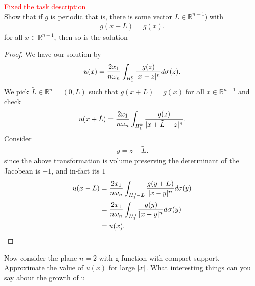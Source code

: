 \begin{exercise}[b]
  \textcolor{Red}{Fixed the task description}\\
 Show that if $g$ is periodic that is, there is some vector $L \in  \mathbb{R}^{n-1} $)  with 
 \begin{align*}
  g(x+L) = g(x)
 .\end{align*}
 for all $x \in  \mathbb{R}^{n-1} $, then so is the solution
\end{exercise}
\begin{proof}
 We have our solution by 
 \begin{align*}
   u(x) = \frac{2x_{1}}{n \omega_n} \int_{H_1^{0} } \frac{g(z)}{\lvert x-z\rvert^{n} } d \sigma(z)
 .\end{align*}
 We pick $\tilde{L} \in  \mathbb{R}^{n} = (0,L) $ such that $g(x+L) = g(x)$ for all $x \in  \mathbb{R}^{n-1} $ and check 
 \begin{align*}
   u(x + \tilde{L}) = \frac{2x_{1}}{n\omega_n} \int_{H_{1}^{0} } \frac{g(z)}{\lvert x+\tilde{L}-z\rvert^{n} }
 .\end{align*}
 Consider 
 \begin{align*}
   y = z-\tilde{L}
 .\end{align*}
 since the above transformation is volume preserving the determinant of the Jacobean is $\pm 1$, and in-fact its $1$
 \begin{align*}
   u(x+L) &=   \frac{2x_{1}}{n\omega_n} \int_{H_{1}^{0}-L } \frac{g(y+L)}{\lvert x-y\rvert^{n} } d\sigma(y)\\
          &= \frac{2x_{1}}{n\omega_n} \int_{H_{1}^{0}} \frac{g(y)}{\lvert x-y\rvert^{n} } d\sigma(y)\\
          &= u(x)
 .\end{align*}
\end{proof}
\newpage
\begin{exercise}[c]
 Now consider the plane $n=2$  with g function with compact support. Approximate the value of $u(x)$ for large $\lvert x\rvert$.
 What interesting things can you say about the growth of u
\end{exercise}
